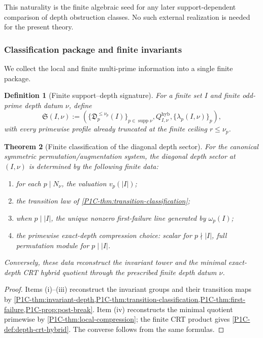 \documentclass[11pt]{article}
\newtheorem{theorem}{Theorem}[section]
\newtheorem{definition}[theorem]{Definition}
\theoremstyle{remark}
\begin{document}
This naturality is the finite algebraic seed for any later support-dependent comparison of depth obstruction classes.  No such external realization is needed for the present theory.

\subsubsection{Classification package and finite invariants}

We collect the local and finite multi-prime information into a single finite package.

\begin{definition}[Finite support--depth signature]
For a finite set \(I\) and finite odd-prime depth datum \(\nu\), define
\[
 \mathfrak S(I,\nu)
 :=\left(
 \{\mathfrak D_p^{\le\nu_p}(I)\}_{p\in\operatorname{supp}\nu},
 Q_{I,\nu}^{\mathrm{hyb}},
 \{\lambda_p(I,\nu)\}_p
 \right),
\]
with every primewise profile already truncated at the finite ceiling \(r\le\nu_p\).
\end{definition}

\begin{theorem}[Finite classification of the diagonal depth sector]\label{P1C-thm:finite-classification}
For the canonical symmetric permutation/augmentation system, the diagonal depth sector at \((I,\nu)\) is determined by the following finite data:
\begin{enumerate}[label=\textup{(\roman*)}]
\item for each \(p\mid N_\nu\), the valuation \(v_p(|I|)\);
\item the transition law of \cref{P1C-thm:transition-classification};
\item when \(p\mid |I|\), the unique nonzero first-failure line generated by \(\omega_p(I)\);
\item the primewise exact-depth compression choice: scalar for \(p\nmid |I|\), full permutation module for \(p\mid |I|\).
\end{enumerate}
Conversely, these data reconstruct the invariant tower and the minimal exact-depth CRT hybrid quotient through the prescribed finite depth datum \(\nu\).
\end{theorem}

\begin{proof}
Items (i)--(iii) reconstruct the invariant groups and their transition maps by \cref{P1C-thm:invariant-depth,P1C-thm:transition-classification,P1C-thm:first-failure,P1C-prop:post-break}.  Item (iv) reconstructs the minimal quotient primewise by \cref{P1C-thm:local-compression}; the finite CRT product gives \cref{P1C-def:depth-crt-hybrid}.  The converse follows from the same formulas.
\end{proof}
\end{document}

